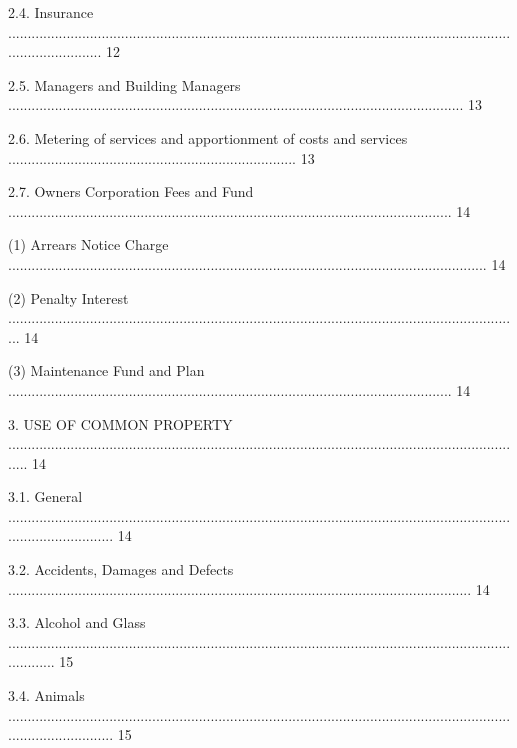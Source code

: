 \documentclass{article}
\begin{document}
{\fontsize{9.99}{1}2.4. Insurance ......................................................................................................................................................... 12 }

{\fontsize{9.99}{1}2.5. Managers and Building Managers ..................................................................................................................... 13 }

{\fontsize{9.99}{1}2.6. Metering of services and apportionment of costs and services .......................................................................... 13 }

{\fontsize{9.99}{1}2.7. Owners Corporation Fees and Fund .................................................................................................................. 14 }

{\fontsize{9.962}{1}(1) Arrears Notice Charge ........................................................................................................................... 14 }

{\fontsize{9.962}{1}(2) Penalty Interest .................................................................................................................................... 14 }

{\fontsize{9.962}{1}(3) Maintenance Fund and Plan .................................................................................................................. 14 }

{\fontsize{9.99}{1}3. USE OF COMMON PROPERTY ...................................................................................................................................... 14 }

{\fontsize{9.99}{1}3.1. General ............................................................................................................................................................ 14 }

{\fontsize{9.99}{1}3.2. Accidents, Damages and Defects ....................................................................................................................... 14 }

{\fontsize{9.99}{1}3.3. Alcohol and Glass ............................................................................................................................................. 15 }

{\fontsize{9.99}{1}3.4. Animals ............................................................................................................................................................ 15 }
\end{document}
